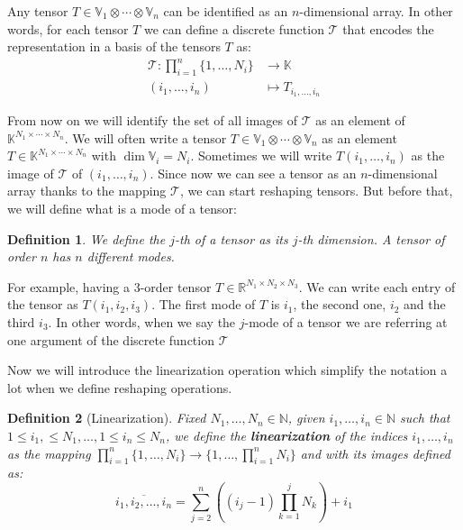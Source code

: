\documentclass[11pt,a4paper,openright,oneside]{book}
\numberwithin{equation}{section}
\newtheorem{defn0}{Definition}[chapter]
\newenvironment{definition}{ \begin{defn0}}{\end{defn0}}
\begin{document}
Any tensor $T \in \mathbb{V}_1 \otimes \cdots \otimes \mathbb{V}_n$ can be identified as an $n$-dimensional array. In other words, for each
tensor $T$ we can define a discrete function $\mathcal{T}$ that encodes the representation in a basis of the tensors $T$ as:
$$\begin{align}
    \mathcal{T}: \prod_{i=1}^n \{1, \dots, N_i\} & \longrightarrow \mathbb{K} \\
    (i_1, \dots, i_n) & \longmapsto T_{i_1, \dots, i_n}
\end{align}$$

From now on we will identify the set of all images of $\mathcal{T}$ as
an element of ${\mathbb{K}^{N_1 \times \cdots \times N_n}}$.
We will often write a tensor $T \in \mathbb{V}_1 \otimes \cdots \otimes \mathbb{V}_n$ as an element $T \in \mathbb{K}^{N_1 \times \cdots \times N_n}$
with $\dim \mathbb{V}_i = N_i$. Sometimes we will write $T(i_1, \dots, i_n)$ as the image of $\mathcal{T}$ of $(i_1, \dots, i_n)$.
Since now we can see a tensor as an $n$-dimensional array thanks to the mapping $\mathcal{T}$, we can 
start reshaping tensors. But before that, we will define what is a mode of a tensor:

\begin{definition}
We define the $j$-th of a tensor as its $j$-th dimension. A tensor of order $n$ has $n$ different modes.
\end{definition}

For example, having a $3$-order tensor $T \in \mathbb{R}^{N_1 \times N_2 \times N_3}$. We can write each entry of the tensor
as $T(i_1, i_2, i_3)$. The first mode of $T$ is $i_1$, the second one, $i_2$ and the third $i_3$. In other words, when we say
the $j$-mode of a tensor we are referring at one argument of the discrete function $\mathcal{T}$


Now we will introduce the linearization operation which simplify the notation a lot when we define
reshaping operations.

\begin{definition}[Linearization]
    Fixed $N_1, \dots, N_n \in \mathbb{N}$, given $i_1, \dots, i_n \in \mathbb{N}$ such that $1 \leqslant i_1, \leqslant N_1, \dots, 1 \leqslant i_n \leqslant N_n$,
    we define the \textbf{linearization} of the indices $i_1, \dots, i_n$ as the mapping ${\prod_{i=1}^n \{1, \dots, N_i\} \rightarrow \{1, \dots, \prod_{i=1}^n N_i\}}$ and
    with its images defined as:
    $$\overline {i_1, i_2, \dots, i_n} = \sum_{j=2}^{n} \left( (i_j - 1) \prod_{k=1}^j N_k \right) + i_1$$
\end{definition}
\end{document}
